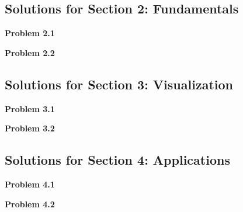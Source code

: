 \documentclass[12pt,letterpaper]{article}
\begin{document}
\begin{solution}
\end{solution}


\subsection{Solutions for Section 2: Fundamentals}

\textbf{Problem 2.1}

\begin{solution}
\end{solution}

\textbf{Problem 2.2}

\begin{solution}
\end{solution}


\subsection{Solutions for Section 3: Visualization}

\textbf{Problem 3.1}

\begin{solution}
\end{solution}

\textbf{Problem 3.2}

\begin{solution}
\end{solution}


\subsection{Solutions for Section 4: Applications}

\textbf{Problem 4.1}

\begin{solution}
\end{solution}

\textbf{Problem 4.2}

\begin{solution}
\end{solution}
\end{document}
